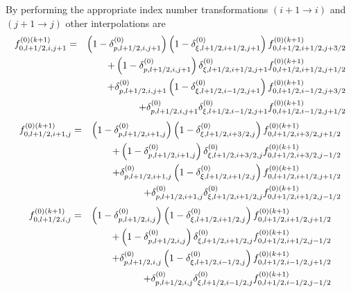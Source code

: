 By performing the appropriate index number transformations $\left(
i+1\rightarrow i\right) $ and $\left( j+1\rightarrow j\right)$ other
interpolations are 
\begin{eqnarray}
f_{0,l+1/2,i,j+1}^{\left( 0\right) (k+1)} &=&\left( 1-\delta
_{p,l+1/2,i,j+1}^{\left( 0\right) }\right) \left( 1-\delta _{\xi
,l+1/2,i+1/2,j+1}^{\left( 0\right) }\right) f_{0,l+1/2,i+1/2,j+3/2}^{\left(
0\right) (k+1)}  \notag \\
&&+\left( 1-\delta _{p,l+1/2,i,j+1}^{\left( 0\right) }\right) \delta _{\xi
,l+1/2,i+1/2,j+1}^{\left( 0\right) }f_{0,l+1/2,i+1/2,j+1/2}^{\left( 0\right)
(k+1)}  \notag \\
&&+\delta _{p,l+1/2,i,j+1}^{\left( 0\right) }\left( 1-\delta _{\xi
,l+1/2,i-1/2,j+1}^{\left( 0\right) }\right) f_{0,l+1/2,i-1/2,j+3/2}^{\left(
0\right) (k+1)}  \notag \\
&&+\delta _{p,l+1/2,i,j+1}^{\left( 0\right) }\delta _{\xi
,l+1/2,i-1/2,j+1}^{\left( 0\right) }f_{0,l+1/2,i-1/2,j+1/2}^{\left( 0\right)
(k+1)}
\end{eqnarray}
\begin{eqnarray}
f_{0,l+1/2,i+1,j}^{\left( 0\right) (k+1)} &=&\left( 1-\delta
_{p,l+1/2,i+1,j}^{\left( 0\right) }\right) \left( 1-\delta _{\xi
,l+1/2,i+3/2,j}^{\left( 0\right) }\right) f_{0,l+1/2,i+3/2,j+1/2}^{\left(
0\right) (k+1)}  \notag \\
&&+\left( 1-\delta _{p,l+1/2,i+1,j}^{\left( 0\right) }\right) \delta _{\xi
,l+1/2,i+3/2,j}^{\left( 0\right) }f_{0,l+1/2,i+3/2,j-1/2}^{\left( 0\right)
(k+1)}  \notag \\
&&+\delta _{p,l+1/2,i+1,j}^{\left( 0\right) }\left( 1-\delta _{\xi
,l+1/2,i+1/2,j}^{\left( 0\right) }\right) f_{0,l+1/2,i+1/2,j+1/2}^{\left(
0\right) (k+1)}  \notag \\
&&+\delta _{p,l+1/2,i+1,j}^{\left( 0\right) }\delta _{\xi
,l+1/2,i+1/2,j}^{\left( 0\right) }f_{0,l+1/2,i+1/2,j-1/2}^{\left( 0\right)
(k+1)}
\end{eqnarray}
\begin{eqnarray}
f_{0,l+1/2,i,j}^{\left( 0\right) (k+1)} &=&\left( 1-\delta
_{p,l+1/2,i,j}^{\left( 0\right) }\right) \left( 1-\delta _{\xi
,l+1/2,i+1/2,j}^{\left( 0\right) }\right) f_{0,l+1/2,i+1/2,j+1/2}^{\left(
0\right) (k+1)}  \notag \\
&&+\left( 1-\delta _{p,l+1/2,i,j}^{\left( 0\right) }\right) \delta _{\xi
,l+1/2,i+1/2,j}^{\left( 0\right) }f_{0,l+1/2,i+1/2,j-1/2}^{\left( 0\right)
(k+1)}  \notag \\
&&+\delta _{p,l+1/2,i,j}^{\left( 0\right) }\left( 1-\delta _{\xi
,l+1/2,i-1/2,j}^{\left( 0\right) }\right) f_{0,l+1/2,i-1/2,j+1/2}^{\left(
0\right) (k+1)}  \notag \\
&&+\delta _{p,l+1/2,i,j}^{\left( 0\right) }\delta _{\xi
,l+1/2,i-1/2,j}^{\left( 0\right) }f_{0,l+1/2,i-1/2,j-1/2}^{\left( 0\right)
(k+1)}
\end{eqnarray}

